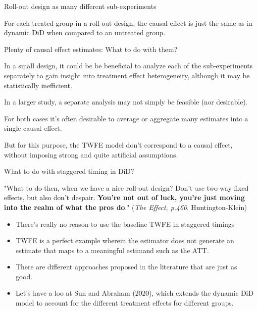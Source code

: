 \documentclass[notes,11pt, aspectratio=169]{beamer}
\newenvironment{wideitemize}{\itemize\addtolength{\itemsep}{10pt}}{\enditemize}
\begin{document}
\begin{frame}{Roll-out design as many different sub-experiments}
      \begin{wideitemize}
          \item For each treated group in a roll-out design, the causal effect is just the same as in dynamic DiD when compared to an untreated group.
          \item Plenty of causal effect estimates: What to do with them? 
         \begin{wideitemize}
          \item In a small design, it could be be beneficial to analyze each of the sub-experiments separately to gain insight into treatment effect heterogeneity, although it may be statistically inefficient.
          \item In a larger study, a separate analysis may not simply be feasible (nor desirable). 
          \end{wideitemize} 
          \item For both cases it's often desirable to average or aggregate many estimates into a single causal effect.  
          \item But for this purpose, the TWFE model don't correspond to a causal effect, without imposing strong and quite artificial assumptions.
          
      \end{wideitemize}
\end{frame}

\begin{frame}{What to do with staggered timing in DiD?}

  \begin{center}
      "What to do then, when we have a nice roll-out design? Don't use two-way fixed effects, but also don't despair. \textbf{You're not out of luck, you're just moving into the realm of what the pros do}."  \tiny (\emph{The Effect, p.460}, Huntington-Klein)
  \end{center}
  
  \begin{itemize}
  \item There's really no reason to use the baseline TWFE in staggered timings
    \item TWFE is a perfect example wherein the estimator does not generate an
      estimate that maps to a meaningful estimand such as the ATT.

  \item There are different approaches proposed in the literature that are just as good.
    \item Let's have a loo at Sun and Abraham (2020), which extends the dynamic DiD model to account for the different treatment effects for different groups.     
    \end{itemize}
\end{frame}
\end{document}
